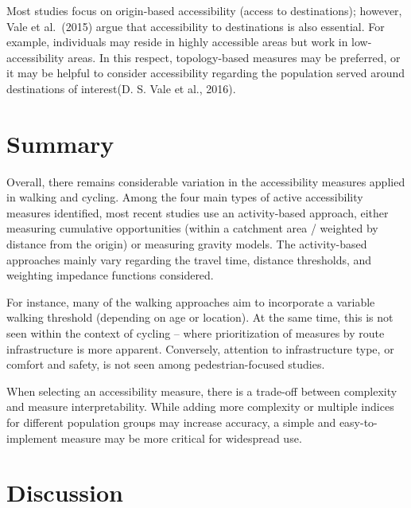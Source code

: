 \documentclass[12pt,twoside]{reedthesis}
\begin{document}
Most studies focus on origin-based accessibility (access to destinations); however, Vale et al.~(2015) argue that accessibility to destinations is also essential. For example, individuals may reside in highly accessible areas but work in low-accessibility areas. In this respect, topology-based measures may be preferred, or it may be helpful to consider accessibility regarding the population served around destinations of interest(D. S. Vale et al., 2016).

\hypertarget{summary}{%
\section{Summary}\label{summary}}

Overall, there remains considerable variation in the accessibility measures applied in walking and cycling. Among the four main types of active accessibility measures identified, most recent studies use an activity-based approach, either measuring cumulative opportunities (within a catchment area / weighted by distance from the origin) or measuring gravity models. The activity-based approaches mainly vary regarding the travel time, distance thresholds, and weighting impedance functions considered.

For instance, many of the walking approaches aim to incorporate a variable walking threshold (depending on age or location). At the same time, this is not seen within the context of cycling -- where prioritization of measures by route infrastructure is more apparent. Conversely, attention to infrastructure type, or comfort and safety, is not seen among pedestrian-focused studies.

When selecting an accessibility measure, there is a trade-off between complexity and measure interpretability. While adding more complexity or multiple indices for different population groups may increase accuracy, a simple and easy-to-implement measure may be more critical for widespread use.

\hypertarget{discussion}{%
\section{Discussion}\label{discussion}}
\end{document}
